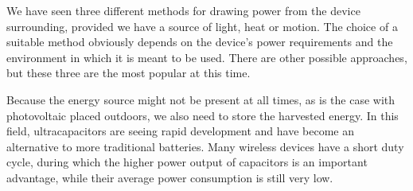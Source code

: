 \documentclass[a4paper,10pt]{article}
\begin{document}
We have seen three different methods for drawing power from the device surrounding, provided we have a source of light, heat or motion. The choice of a suitable method obviously depends on the device's power requirements and the environment in which it is meant to be used. There are other possible approaches, but these three are the most popular at this time. 

Because the energy source might not be present at all times, as is the case with photovoltaic placed outdoors, we also need to store the harvested energy. In this field, ultracapacitors are seeing rapid development and have become an alternative to more traditional batteries. Many wireless devices have a short duty cycle, during which the higher power output of capacitors is an important advantage, while their average power consumption is still very low. 

\newpage


 
\end{document}
